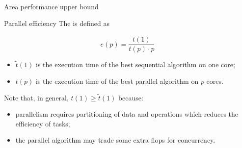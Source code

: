 \begin{frame}{Area performance upper bound}


  \begin{block}{Parallel efficiency}
    The  is defined as
    
    \begin{displaymath}
      e(p) = \frac{\tilde{t}(1)}{t(p)\cdot p}
    \end{displaymath}
    
    \begin{itemize}
    \item $\tilde{t}(1)$ is the execution time of the \alert{best
        sequential algorithm} on one core;
    \item $t(p)$ is the execution time of the \alert{best parallel
        algorithm} on $p$ cores.
    \end{itemize}
  \end{block}
    
    \vspace{0.2cm}
    
  Note that, in general, $t(1) \ge \tilde{t}(1)$ because:
  \begin{itemize}
  \item parallelism requires partitioning of data and operations which
    reduces the efficiency of tasks;
  \item the parallel algorithm may trade some extra flops for
    concurrency.
  \end{itemize}


\end{frame}








